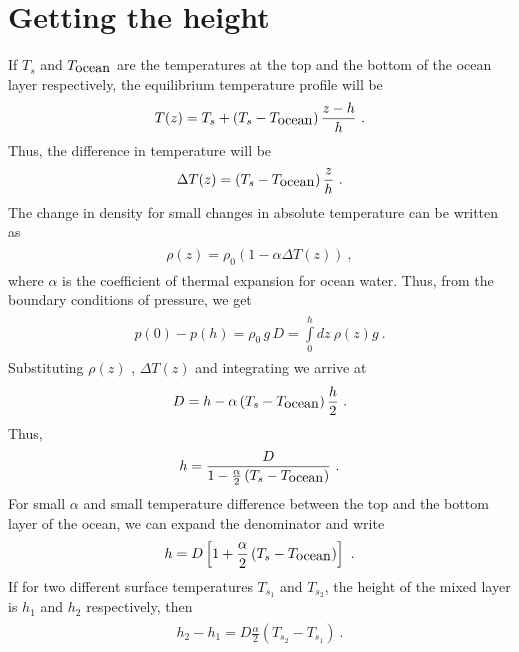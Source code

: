 \documentclass[fontsize = 13pt]{scrartcl}
\begin{document}
\section{Getting the height}
If \(T_s\) and \(T_{\mbox{ocean}}\) are the temperatures at the top and the bottom of the ocean layer respectively, the equilibrium temperature profile will be
\begin{align}
\begin{split}
    T(z) = T_s + \left( T_s - T_{\mbox{ocean}} \right)\frac{z -h}{h} \ .
\end{split}
\end{align}
Thus, the difference in temperature will be 
\begin{align}
\begin{split}
    \Delta T (z) = \left( T_s - T_{\mbox{ocean}} \right)\frac{z}{h} \ .
\end{split}
\end{align}
The change in density for small changes in absolute temperature can be written as
\begin{align}
\begin{split}
    \rho(z) = \rho_0 \left( 1 -\alpha \Delta T(z) \right) \ ,
\end{split}
\end{align}
where \(\alpha\) is the coefficient of thermal expansion for ocean water. Thus, from the boundary conditions of pressure, we get
\begin{align}
\begin{split}
    p(0) - p(h) =    \rho_0\,g\,D  = \int\limits_{0}^{h} dz\  \rho(z) g  \ . 
\end{split}
\end{align}
Substituting $\rho(z)$ , $\Delta T(z)$ and integrating we arrive at
\begin{align}
\begin{split}
    D = h - \alpha \left( T_s - T_{\mbox{ocean}} \right)\frac{h}{2} \ .
\end{split}
\end{align}
Thus, 
\begin{align}
\begin{split}
    h = \frac{D}{1 - \frac{\alpha}{2} \left( T_s - T_{\mbox{ocean}} \right)} \ .
\end{split}
\end{align}
For small \(\alpha \) and small temperature difference between the top and the bottom layer of the ocean, we can expand the denominator and write
\begin{align}
\begin{split}
    h = D\left[ 1 +   \frac{\alpha}{2} \left( T_s - T_{\mbox{ocean}} \right)\right] \ .
\end{split}
\end{align}
If for two different surface temperatures $T_{s_1}$ and $T_{s_2}$, the height of the mixed layer is $h_1$ and $h_2$ respectively, then 
\begin{align}
\begin{split}
    h_2 - h_1 =D \frac{\alpha}{2} \left( T_{s_2} -  T_{s_1} \right) \ .
\end{split}
\end{align}
\end{document}
